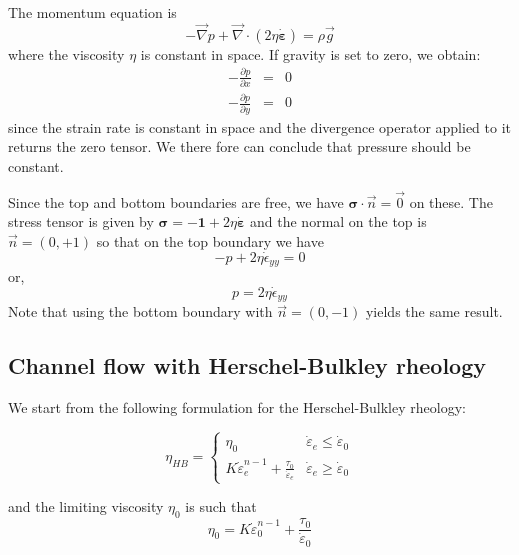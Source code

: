 The momentum equation is 
\[
-\vec\nabla p + \vec\nabla \cdot (2 \eta \dot{\bm\varepsilon}) = \rho \vec g
\]
where the viscosity $\eta$ is constant in space. 
If gravity is set to zero, we obtain:
\begin{eqnarray}
-\frac{\partial p}{\partial x} &=& 0 \\
-\frac{\partial p}{\partial y} &=& 0 
\end{eqnarray}
since the strain rate is constant in space and the divergence operator applied to it returns 
the zero tensor. We there fore can conclude that pressure should be constant. 

Since the top and bottom boundaries are free, we have ${\bm \sigma}\cdot \vec{n} = \vec{0}$ on these.
The stress tensor is given by ${\bm \sigma} = - {\bm 1} + 2 \eta \dot{\bm \varepsilon}$ and the normal on the 
top is $\vec{n}=(0,+1)$ so that on the top boundary we have
\[
- p + 2 \eta \dot{\epsilon}_{yy} = 0
\]
or, 
\[
p= 2 \eta \dot{\epsilon}_{yy} 
\]
Note that using the bottom boundary with $\vec{n}=(0,-1)$ yields the same result.


\newpage
\subsection{Channel flow with Herschel-Bulkley rheology \label{ss:HBflow}}

We start from the following formulation for the Herschel-Bulkley rheology:
\begin{mdframed}[backgroundcolor=blue!5]
\[
\eta_{HB}
=
\left\{
\begin{array}{lc}
\eta_0 & \dot{\varepsilon}_e\leq \dot{\varepsilon}_0 \\
K  \dot{\varepsilon}_e^{n-1} + \frac{\tau_0}{\dot{\varepsilon}_e}  
& \dot{\varepsilon}_e\geq \dot{\varepsilon}_0 
\end{array}
\right.
\]
\end{mdframed}
and the limiting viscosity $\eta_0$ is such that 
\[
\eta_0 = K  \dot{\varepsilon}_0^{n-1} + \frac{\tau_0}{\dot{\varepsilon}_0}  
\]

